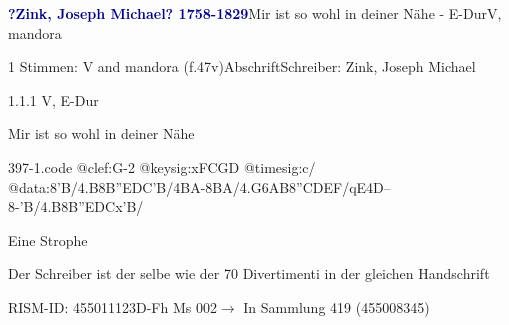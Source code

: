 \documentclass[twocolumn]{book}
\begin{document}
\par \vspace{7pt} \textcolor{darkblue}{\textbf{?Zink, Joseph Michael?  1758-1829}}\hfillplus{\textbf{[397]}}\newline Mir ist so wohl in deiner Nähe - E-Dur\newline V, mandora
\par \begin{itshape}\end{itshape} 
\par \textcolor{darkblue}{}  1 Stimmen: V and mandora  (f.47v)\newline Abschrift\newline Schreiber: Zink, Joseph Michael
\par 1.1.1  V, E-Dur\newline \begin{footnotesize} Mir ist so wohl in deiner Nähe \end{footnotesize}  
\begin{filecontents*}{397-1.code}
@clef:G-2
@keysig:xFCGD
@timesig:c/
@data:8'B/4.B8B''EDC'B/4BA-{8BA}/4.G{6AB}8''CDEF/qE4D--8-'B/4.B8B''EDCx'B/
\end{filecontents*}
\newline
%
\par Eine Strophe
\par Der Schreiber ist der selbe wie der 70 Divertimenti in der gleichen Handschrift
\par RISM-ID: 455011123\newline D-Fh  Ms 002\newline $\rightarrow$ In Sammlung 419 (455008345)
      
\end{document}
